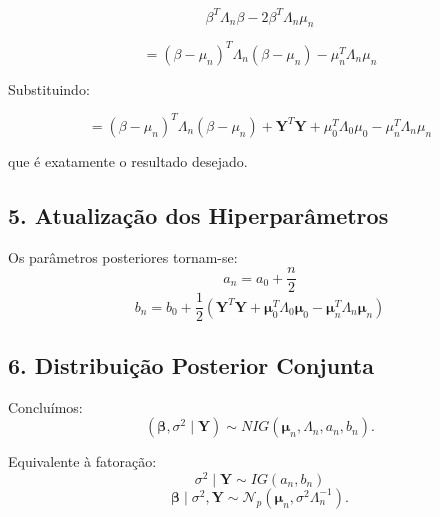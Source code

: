 \documentclass[12pt, a4paper]{article}
\begin{document}
\[
\beta^T\Lambda_n\beta
-
2\beta^T\Lambda_n\mu_n
\]

\[
=
(\beta-\mu_n)^T
\Lambda_n
(\beta-\mu_n)
-
\mu_n^T\Lambda_n\mu_n
\]

Substituindo:

\[
=
(\beta-\mu_n)^T
\Lambda_n
(\beta-\mu_n)
+
\mathbf Y^T\mathbf Y
+
\mu_0^T\Lambda_0\mu_0
-
\mu_n^T\Lambda_n\mu_n
\]

que é exatamente o resultado desejado.

\vspace{0.4cm}

\subsection*{5. Atualização dos Hiperparâmetros}

Os parâmetros posteriores tornam-se:
\[ \boxed{a_n = a_0+\frac{n}{2}} \]
\[ \boxed{b_n = b_0 + \frac{1}{2} \left( \mathbf{Y}^T\mathbf{Y} + \boldsymbol{\mu}_0^T\Lambda_0\boldsymbol{\mu}_0 - \boldsymbol{\mu}_n^T\Lambda_n\boldsymbol{\mu}_n \right)} \]

\vspace{0.4cm}

\subsection*{6. Distribuição Posterior Conjunta}

Concluímos:
\[ (\boldsymbol{\beta},\sigma^2\mid \mathbf{Y}) \sim NIG(\boldsymbol{\mu}_n,\Lambda_n,a_n,b_n). \]

Equivalente à fatoração:
\[ \sigma^2\mid \mathbf{Y} \sim IG(a_n,b_n) \]
\[ \boldsymbol{\beta}\mid\sigma^2,\mathbf{Y} \sim \mathcal{N}_p ( \boldsymbol{\mu}_n, \sigma^2\Lambda_n^{-1} ). \]

\vspace{0.4cm}




\end{document}
